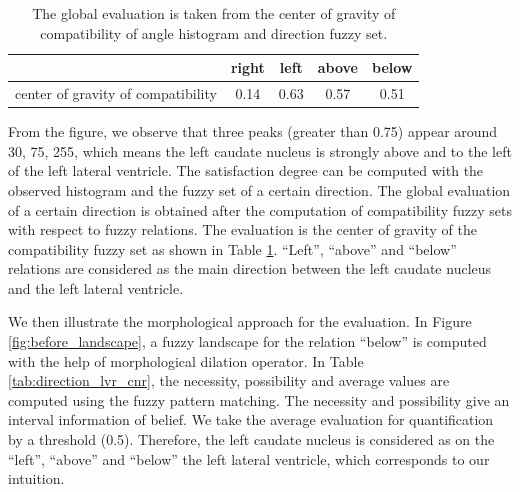 \documentclass{article}
\begin{document}
\begin{table}[H]
\begin{center}
   \begin{tabular}{| c || c | c | c | c |}
     \hline
     & right & left & above & below\\ \hline
     center of gravity of compatibility & 0.14  & 0.63 & 0.57  &  0.51 \\
     \hline
   \end{tabular}
    \caption{ The global evaluation is taken from the center of gravity of compatibility of angle histogram and direction fuzzy set.}\label{tab:cp_lvr_cnr}
     \end{center}
    \end{table}
From the figure, we observe that three peaks (greater than 0.75) appear around 30, 75, 255, which means the left caudate nucleus is strongly above and to the left of the left lateral ventricle.
The satisfaction degree can be computed with the observed histogram and the fuzzy set of a certain direction.
The global evaluation of a certain direction is obtained after the computation of compatibility fuzzy sets with respect to fuzzy relations.
The evaluation is the center of gravity of the compatibility fuzzy set as shown in Table \ref{tab:cp_lvr_cnr}.
``Left'', ``above'' and ``below'' relations are considered as the main direction between the left caudate nucleus and the left lateral ventricle.

We then illustrate the morphological approach for the evaluation. In Figure \ref{fig:before_landscape}, a fuzzy landscape for the relation ``below'' is computed with the help of morphological dilation operator.
In Table \ref{tab:direction_lvr_cnr}, the necessity, possibility and average values are computed using the fuzzy pattern matching. The necessity and possibility give an interval information of belief.
We take the average evaluation for quantification by a threshold (0.5). Therefore, the left caudate nucleus is considered as on the ``left'', ``above'' and ``below'' the left lateral ventricle,
which corresponds to our intuition.
\end{document}
